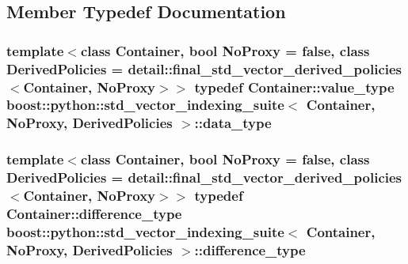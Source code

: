 \subsection{\-Member \-Typedef \-Documentation}
\hypertarget{classboost_1_1python_1_1std__vector__indexing__suite_a9c3db9df25d6966c54154275377c94ce}{
\subsubsection[{data\-\_\-type}]{\setlength{\rightskip}{0pt plus 5cm}template$<$class \-Container, bool \-No\-Proxy = false, class \-Derived\-Policies = detail\-::final\-\_\-std\-\_\-vector\-\_\-derived\-\_\-policies$<$\-Container, No\-Proxy$>$$>$ typedef \-Container\-::value\-\_\-type {\bf boost\-::python\-::std\-\_\-vector\-\_\-indexing\-\_\-suite}$<$ \-Container, \-No\-Proxy, \-Derived\-Policies $>$\-::{\bf data\-\_\-type}}}\label{classboost_1_1python_1_1std__vector__indexing__suite_a9c3db9df25d6966c54154275377c94ce}
\hypertarget{classboost_1_1python_1_1std__vector__indexing__suite_a546a5483c04385c153a5987f5ba16709}{
\subsubsection[{difference\-\_\-type}]{\setlength{\rightskip}{0pt plus 5cm}template$<$class \-Container, bool \-No\-Proxy = false, class \-Derived\-Policies = detail\-::final\-\_\-std\-\_\-vector\-\_\-derived\-\_\-policies$<$\-Container, No\-Proxy$>$$>$ typedef \-Container\-::difference\-\_\-type {\bf boost\-::python\-::std\-\_\-vector\-\_\-indexing\-\_\-suite}$<$ \-Container, \-No\-Proxy, \-Derived\-Policies $>$\-::{\bf difference\-\_\-type}}}\label{classboost_1_1python_1_1std__vector__indexing__suite_a546a5483c04385c153a5987f5ba16709}

